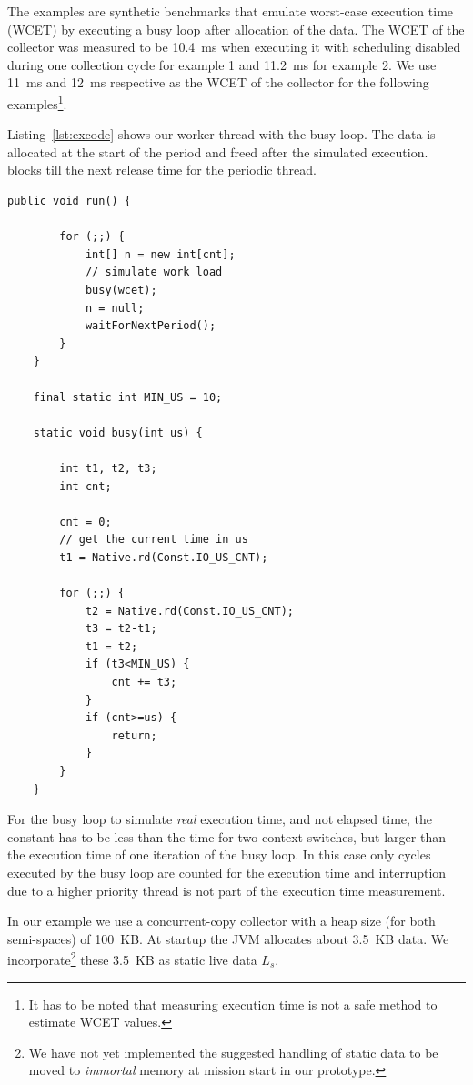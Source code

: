 The examples are synthetic benchmarks that emulate worst-case
execution time (WCET) by executing a busy loop after allocation of
the data. The WCET of the collector was measured to be 10.4~ms when
executing it with scheduling disabled during one collection cycle
for example 1 and 11.2~ms for example 2. We use 11~ms and 12~ms
respective as the WCET of the collector for the following
examples\footnote{It has to be noted that measuring execution time
is not a safe method to estimate WCET values.}.


Listing~\ref{lst:excode} shows our worker thread with the busy loop.
The data is allocated at the start of the period and freed after the
simulated execution.  blocks till the next
release time for the periodic thread.

\begin{lstlisting}[float, caption={Example periodic thread with a busy loop},
label=lst:excode]
    public void run() {

        for (;;) {
            int[] n = new int[cnt];
            // simulate work load
            busy(wcet);
            n = null;
            waitForNextPeriod();
        }
    }

    final static int MIN_US = 10;

    static void busy(int us) {

        int t1, t2, t3;
        int cnt;

        cnt = 0;
        // get the current time in us
        t1 = Native.rd(Const.IO_US_CNT);

        for (;;) {
            t2 = Native.rd(Const.IO_US_CNT);
            t3 = t2-t1;
            t1 = t2;
            if (t3<MIN_US) {
                cnt += t3;
            }
            if (cnt>=us) {
                return;
            }
        }
    }
\end{lstlisting}

For the busy loop to simulate \emph{real} execution time, and not
elapsed time, the constant  has to be less than the
time for two context switches, but larger than the execution time of
one iteration of the busy loop. In this case only cycles executed by
the busy loop are counted for the execution time and interruption
due to a higher priority thread is not part of the execution time
measurement.

In our example we use a concurrent-copy collector with a heap size
(for both semi-spaces) of 100~KB. At startup the JVM allocates about
3.5~KB data. We incorporate\footnote{We have not yet implemented the
suggested handling of static data to be moved to \emph{immortal}
memory at mission start in our prototype.} these 3.5~KB as static
live data $L_s$.



